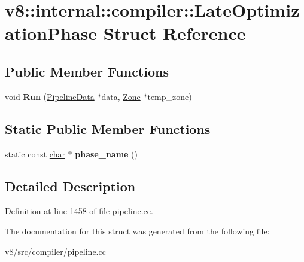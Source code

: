 \hypertarget{structv8_1_1internal_1_1compiler_1_1LateOptimizationPhase}{}\section{v8\+:\+:internal\+:\+:compiler\+:\+:Late\+Optimization\+Phase Struct Reference}
\label{structv8_1_1internal_1_1compiler_1_1LateOptimizationPhase}
\subsection*{Public Member Functions}
\begin{DoxyCompactItemize}
\item 
\mbox{\label{structv8_1_1internal_1_1compiler_1_1LateOptimizationPhase_a0b8bfb2a5de27ba00e224adebae26bc0}} 
void {\bfseries Run} (\mbox{\hyperlink{classv8_1_1internal_1_1compiler_1_1PipelineData}{Pipeline\+Data}} $\ast$data, \mbox{\hyperlink{classv8_1_1internal_1_1Zone}{Zone}} $\ast$temp\+\_\+zone)
\end{DoxyCompactItemize}
\subsection*{Static Public Member Functions}
\begin{DoxyCompactItemize}
\item 
\mbox{\label{structv8_1_1internal_1_1compiler_1_1LateOptimizationPhase_a1b09816077947b18580171b4281cc557}} 
static const \mbox{\hyperlink{classchar}{char}} $\ast$ {\bfseries phase\+\_\+name} ()
\end{DoxyCompactItemize}


\subsection{Detailed Description}


Definition at line 1458 of file pipeline.\+cc.



The documentation for this struct was generated from the following file\+:\begin{DoxyCompactItemize}
\item 
v8/src/compiler/pipeline.\+cc\end{DoxyCompactItemize}
